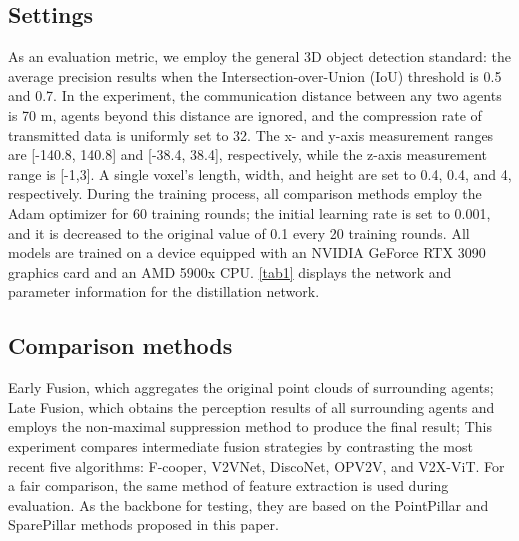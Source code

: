 \documentclass[lettersize,journal]{IEEEtran}
\begin{document}
\subsection{Settings}

As an evaluation metric, we employ the general 3D object detection standard: the average precision results when the Intersection-over-Union (IoU) threshold is 0.5 and 0.7. In the experiment, the communication distance between any two agents is 70 m, agents beyond this distance are ignored, and the compression rate of transmitted data is uniformly set to 32. The x- and y-axis measurement ranges are [-140.8, 140.8] and [-38.4, 38.4], respectively, while the z-axis measurement range is [-1,3]. A single voxel's length, width, and height are set to 0.4, 0.4, and 4, respectively. During the training process, all comparison methods employ the Adam \cite{37} optimizer for 60 training rounds; the initial learning rate is set to 0.001, and it is decreased to the original value of 0.1 every 20 training rounds. All models are trained on a device equipped with an NVIDIA GeForce RTX 3090 graphics card and an AMD 5900x CPU. \ref{tab1} displays the network and parameter information for the distillation network.


\subsection{Comparison methods}
Early Fusion, which aggregates the original point clouds of surrounding agents; Late Fusion, which obtains the perception results of all surrounding agents and employs the non-maximal suppression method to produce the final result; This experiment compares intermediate fusion strategies by contrasting the most recent five algorithms: F-cooper, V2VNet, DiscoNet, OPV2V, and V2X-ViT. For a fair comparison, the same method of feature extraction is used during evaluation. As the backbone for testing, they are based on the PointPillar \cite{19} and SparePillar methods proposed in this paper.
\end{document}

